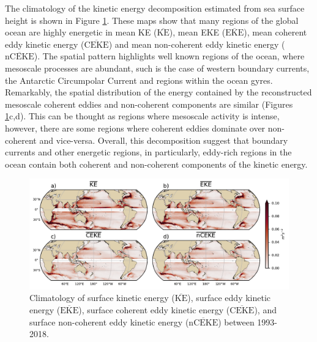 \documentclass[draft,linenumbers]{agujournal2019}
\newcommand{\MKE}{\overline{\textrm{KE}}}
\newcommand{\MEKE}{\overline{\textrm{EKE}}}
\newcommand{\MCEKE}{\overline{\textrm{CEKE}}}
\newcommand{\MnCEKE}{\overline{\textrm{nCEKE}}}
\begin{document}
	The climatology of the kinetic energy decomposition estimated from sea surface height is shown in Figure \ref{fig:eddy_climatology}. 
	These maps show that many regions of the global ocean are highly energetic in mean KE ($\MKE$), mean EKE ($\MEKE$), mean coherent eddy kinetic energy ($\MCEKE$) and mean non-coherent eddy kinetic energy ($\MnCEKE$). 
	The spatial pattern highlights well known regions of the ocean, where mesoscale processes are abundant, such is the case of western boundary currents, the Antarctic Circumpolar Current and regions within the ocean gyres. 
	Remarkably, the spatial distribution of the energy contained by the reconstructed mesoscale coherent eddies and non-coherent components are similar (Figures \ref{fig:eddy_climatology}c,d). 
	This can be thought as regions where mesoscale activity is intense, however, there are some regions where coherent eddies dominate over non-coherent and vice-versa. 
	Overall, this decomposition suggest that boundary currents and other energetic regions, in particularly, eddy-rich regions in the ocean contain both coherent and non-coherent components of the kinetic energy.

	\begin{figure}[t]
	    \centering
	    \includegraphics[width=1\textwidth]{figures/mean_ke_maps_satellite.pdf}
	    \caption{Climatology of surface kinetic energy ($\MKE$), surface eddy kinetic energy ($\MEKE$), surface coherent eddy kinetic energy ($\MCEKE$), and surface non-coherent eddy kinetic energy ($\MnCEKE$) between 1993-2018.}
	    \label{fig:eddy_climatology}
	\end{figure}
\end{document}
